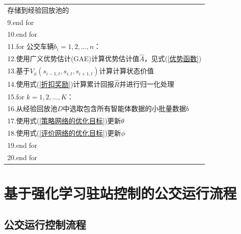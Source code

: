 \begin{table}[!ht]
{\begin{tabular}{p{}}
存储到经验回放池的\\
9.\hspace{1em}\hspace{1em}end for\\
10.\hspace{1em}end for \\
11.\hspace{1em}for 公交车辆$b_i =1 ,2,...,n$：\\
12.\hspace{1em}\hspace{1em}使用广义优势估计(GAE)计算优势估计值$\widehat{A}$，见式(\ref{优势函数}) \\
13.\hspace{1em}\hspace{1em}基于$V_{\phi}(s_{i-1,t},s_{i,t},s_{i+1,t})$计算计算状态价值 \\
14.\hspace{1em}\hspace{1em}使用式(\ref{折扣奖励})计算累计回报$\widehat{R} $并进行归一化处理 \\
15.\hspace{1em}for $k = 1,2,...,K$：\\
16.\hspace{1em}\hspace{1em}从经验回放池$D$中选取包含所有智能体数据的小批量数据$b$ \\
17.\hspace{1em}\hspace{1em}使用式(\ref{策略网络的优化目标})更新$\theta$ \\
18.\hspace{1em}\hspace{1em}使用式(\ref{评价网络的优化目标})更新$\phi$ \\
19.\hspace{1em}end for \\
20.end for\\
\bottomrule
\end{tabular}
}
\end{table}



\section{基于强化学习驻站控制的公交运行流程}

\subsection{公交运行控制流程}

